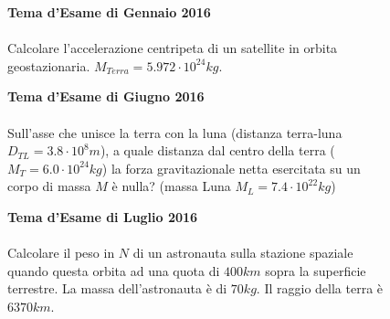 \begin{figure}[h!]
\textbf{Tema d'Esame di Gennaio 2016}\\ \\
Calcolare l’accelerazione centripeta di un satellite in orbita geostazionaria.
$M_{Terra}=5.972\cdot 10^{24} kg$.
\end{figure}

\begin{figure}[h!]
\textbf{Tema d'Esame di Giugno 2016}\\ \\
Sull'asse che unisce la terra con la luna (distanza terra-luna $D_{TL}=3.8\cdot 10^8 m$), a quale distanza dal centro della terra ($M_T=6.0\cdot 10^{24} kg$) la forza gravitazionale netta esercitata su un corpo di massa $M$ è nulla? (massa Luna $M_L=7.4\cdot 10^{22} kg$)
\end{figure}

\begin{figure}[h!]
\textbf{Tema d'Esame di Luglio 2016}\\ \\
Calcolare il peso in $N$ di un astronauta sulla stazione spaziale quando questa orbita ad una quota di $400 km$ sopra la superficie terrestre. La massa dell'astronauta è di $70 kg$. Il raggio della terra è $6370 km$.\\ \\
\noindent{}	
\end{figure}